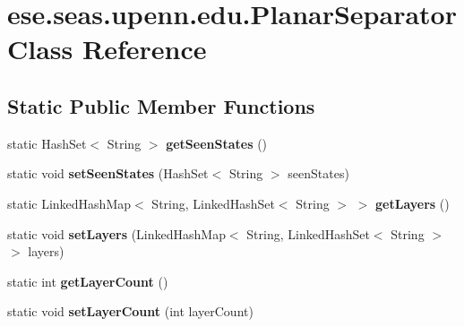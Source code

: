 \hypertarget{classese_1_1seas_1_1upenn_1_1edu_1_1_planar_separator}{}\section{ese.\+seas.\+upenn.\+edu.\+Planar\+Separator Class Reference}
\label{classese_1_1seas_1_1upenn_1_1edu_1_1_planar_separator}
\subsection*{Static Public Member Functions}
\begin{DoxyCompactItemize}
\item 
\hypertarget{classese_1_1seas_1_1upenn_1_1edu_1_1_planar_separator_a54e7709f8e3ce93f4ab73711ed5d6c44}{}static Hash\+Set$<$ String $>$ {\bfseries get\+Seen\+States} ()\label{classese_1_1seas_1_1upenn_1_1edu_1_1_planar_separator_a54e7709f8e3ce93f4ab73711ed5d6c44}

\item 
\hypertarget{classese_1_1seas_1_1upenn_1_1edu_1_1_planar_separator_af92505f765082aa8bb7cbd2e77d5ef29}{}static void {\bfseries set\+Seen\+States} (Hash\+Set$<$ String $>$ seen\+States)\label{classese_1_1seas_1_1upenn_1_1edu_1_1_planar_separator_af92505f765082aa8bb7cbd2e77d5ef29}

\item 
\hypertarget{classese_1_1seas_1_1upenn_1_1edu_1_1_planar_separator_a431b40bb673f68e12c58b018e80a07ef}{}static Linked\+Hash\+Map$<$ String, Linked\+Hash\+Set$<$ String $>$ $>$ {\bfseries get\+Layers} ()\label{classese_1_1seas_1_1upenn_1_1edu_1_1_planar_separator_a431b40bb673f68e12c58b018e80a07ef}

\item 
\hypertarget{classese_1_1seas_1_1upenn_1_1edu_1_1_planar_separator_a4cfee899eb14ed85e85ac4005613f343}{}static void {\bfseries set\+Layers} (Linked\+Hash\+Map$<$ String, Linked\+Hash\+Set$<$ String $>$$>$ layers)\label{classese_1_1seas_1_1upenn_1_1edu_1_1_planar_separator_a4cfee899eb14ed85e85ac4005613f343}

\item 
\hypertarget{classese_1_1seas_1_1upenn_1_1edu_1_1_planar_separator_a246f23da4501f0ad1219dfdc4e1233cd}{}static int {\bfseries get\+Layer\+Count} ()\label{classese_1_1seas_1_1upenn_1_1edu_1_1_planar_separator_a246f23da4501f0ad1219dfdc4e1233cd}

\item 
\hypertarget{classese_1_1seas_1_1upenn_1_1edu_1_1_planar_separator_a3916f7362296694f146a4337591fc7df}{}static void {\bfseries set\+Layer\+Count} (int layer\+Count)\label{classese_1_1seas_1_1upenn_1_1edu_1_1_planar_separator_a3916f7362296694f146a4337591fc7df}


\end{DoxyCompactItemize}
